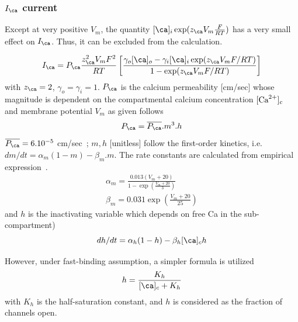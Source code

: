 \subsubsection{$I_\ca$ current}
\label{sec:activation}

\begin{framed}
  Except at very positive $V_m$, the quantity
  $[\ca]_i\exp(z_\ca V_m\frac{F}{RT})$ has a very small effect on
  $I_\ca $. Thus, it can be excluded from the calculation.
\end{framed}

\begin{equation}
  \label{eq:621}
  \begin{split}
    I_\ca  = P_\ca \frac{z_\ca ^2V_mF^2}{RT} \left[
     \frac{ \gamma_{o}[\ca]_o-\gamma_{i}[\ca]_i\exp(z_\ca V_mF/RT)}{1-\exp(z_\ca V_mF/RT)}\right]
  \end{split}
\end{equation}
with $z_\ca =2$, $\gamma_o=\gamma_i=1$. $P_\ca $ is the calcium
permeability [cm/sec] whose magnitude is dependent on the
compartmental calcium concentration $[{\text{Ca}^{2+}}]_c$ and membrane potential
$V_m$ as given follows
\begin{equation}
  \label{eq:622}
  P_\ca =\overline{P_\ca } .m^3.h
\end{equation}
$\overline{P_\ca }=6.10^{-5}$ cm/sec~\citep{ashcroft1982cis}; $m,h$
[unitless] follow the first-order kinetics,
i.e. $dm/dt=\alpha_m(1-m)-\beta_m.m$.  The rate constants are
calculated from empirical expression~\citep{ashcroft1982cis}.
\begin{equation}
  \label{eq:623}
  \begin{split}
    \alpha_m = \frac{0.013(V_m+20)}{1-\exp(\frac{V_m+20}{3})}\\
    \beta_m = 0.031\exp(\frac{V_m+20}{25})
  \end{split}
\end{equation}
and $h$ is the inactivating variable which depends on free Ca in the
sub-compartment)
\begin{equation}
  \label{eq:1252}
  dh/dt = \alpha_h(1-h)-\beta_h [\ca]_c h
\end{equation}


However, under fast-binding assumption, a simpler formula is utilized
\begin{equation}
  \label{eq:624}
  h = \frac{K_h}{[\ca]_c+K_h}
\end{equation}
with $K_h$ is the half-saturation constant, and $h$ is considered as
the fraction of channels open.

